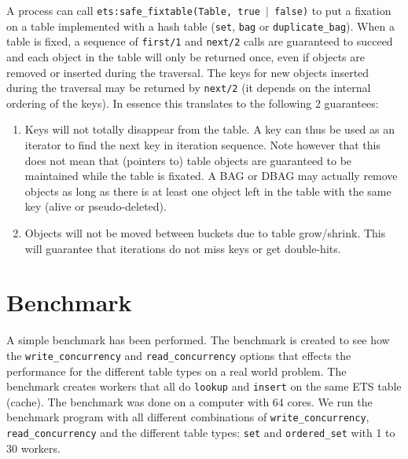 \documentclass[aps,pre,preprint,nofootinbib]{revtex4}
\begin{document}
A process can call \texttt{ets:safe\_fixtable(Table, true $|$ false)} to put a fixation on a table implemented with a hash table (\verb|set|, \verb|bag| or \verb|duplicate_bag|). When a table is fixed, a sequence of \verb|first/1| and \verb|next/2| calls are guaranteed to succeed and each object in the table will only be returned once, even if objects are removed or inserted during the traversal. The keys for new objects inserted during the traversal may be returned by \verb|next/2| (it depends on the internal ordering of the keys). In essence this translates to the following 2 guarantees:

\begin{enumerate}
  \item Keys will not totally disappear from the table. A key can thus be used as an iterator to find the next key in iteration sequence. Note however that this does not mean that (pointers to) table objects are guaranteed to be maintained while the table is fixated. A BAG or DBAG may actually remove objects as long as there is at least one object left in the table with the same key (alive or pseudo-deleted).
    \item Objects will not be moved between buckets due to table grow/shrink. This will guarantee that iterations do not miss keys or get double-hits.
\end{enumerate}

\section{Benchmark} \label{sec:benchmark}

  A simple benchmark has been performed.
  The benchmark is created to see how the \verb|write_concurrency| and \verb|read_concurrency| options that effects the performance for the different table types on a real world problem.
  The benchmark creates workers that all do \verb|lookup| and \verb|insert| on the same ETS table (cache).
  The benchmark was done on a computer with 64 cores.
  We run the benchmark program with all different combinations of \verb|write_concurrency|, \verb|read_concurrency| and the different table types: \verb|set| and \verb|ordered_set| with 1 to 30 workers.
  
\end{document}

